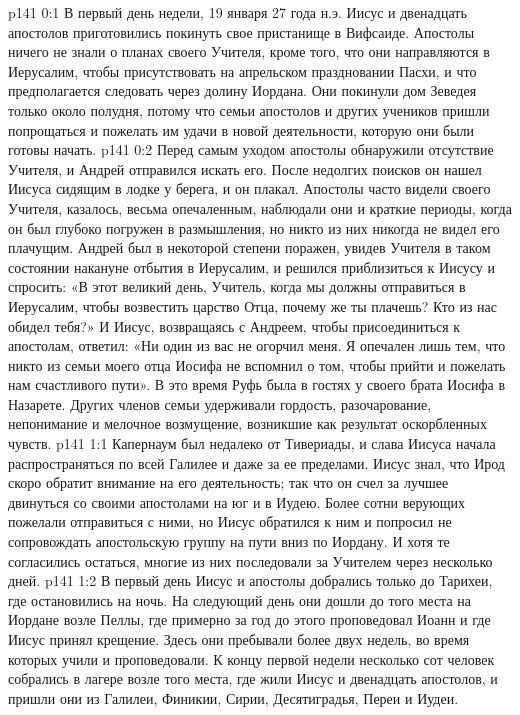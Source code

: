 \vs p141 0:1 В первый день недели, 19 января 27 года н.э. Иисус и двенадцать апостолов приготовились покинуть свое пристанище в Вифсаиде. Апостолы ничего не знали о планах своего Учителя, кроме того, что они направляются в Иерусалим, чтобы присутствовать на апрельском праздновании Пасхи, и что предполагается следовать через долину Иордана. Они покинули дом Зеведея только около полудня, потому что семьи апостолов и других учеников пришли попрощаться и пожелать им удачи в новой деятельности, которую они были готовы начать.
\vs p141 0:2 Перед самым уходом апостолы обнаружили отсутствие Учителя, и Андрей отправился искать его. После недолгих поисков он нашел Иисуса сидящим в лодке у берега, и он плакал. Апостолы часто видели своего Учителя, казалось, весьма опечаленным, наблюдали они и краткие периоды, когда он был глубоко погружен в размышления, но никто из них никогда не видел его плачущим. Андрей был в некоторой степени поражен, увидев Учителя в таком состоянии накануне отбытия в Иерусалим, и решился приблизиться к Иисусу и спросить: «В этот великий день, Учитель, когда мы должны отправиться в Иерусалим, чтобы возвестить царство Отца, почему же ты плачешь? Кто из нас обидел тебя?» И Иисус, возвращаясь с Андреем, чтобы присоединиться к апостолам, ответил: «Ни один из вас не огорчил меня. Я опечален лишь тем, что никто из семьи моего отца Иосифа не вспомнил о том, чтобы прийти и пожелать нам счастливого пути». В это время Руфь была в гостях у своего брата Иосифа в Назарете. Других членов семьи удерживали гордость, разочарование, непонимание и мелочное возмущение, возникшие как результат оскорбленных чувств.
\vs p141 1:1 Капернаум был недалеко от Тивериады, и слава Иисуса начала распространяться по всей Галилее и даже за ее пределами. Иисус знал, что Ирод скоро обратит внимание на его деятельность; так что он счел за лучшее двинуться со своими апостолами на юг и в Иудею. Более сотни верующих пожелали отправиться с ними, но Иисус обратился к ним и попросил не сопровождать апостольскую группу на пути вниз по Иордану. И хотя те согласились остаться, многие из них последовали за Учителем через несколько дней.
\vs p141 1:2 В первый день Иисус и апостолы добрались только до Тарихеи, где остановились на ночь. На следующий день они дошли до того места на Иордане возле Пеллы, где примерно за год до этого проповедовал Иоанн и где Иисус принял крещение. Здесь они пребывали более двух недель, во время которых учили и проповедовали. К концу первой недели несколько сот человек собрались в лагере возле того места, где жили Иисус и двенадцать апостолов, и пришли они из Галилеи, Финикии, Сирии, Десятиградья, Переи и Иудеи.

